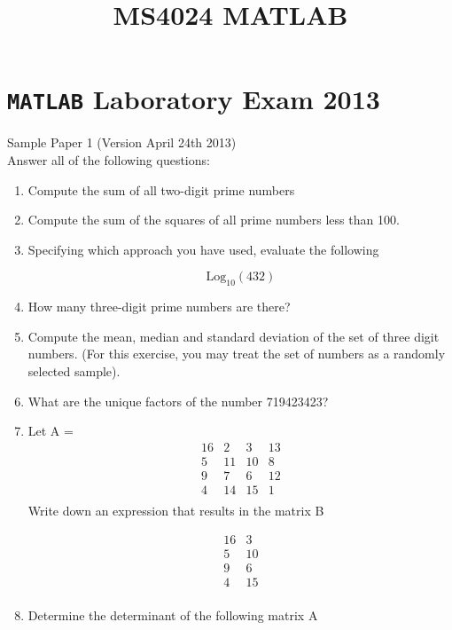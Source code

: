 \documentclass[12pt]{article}
\title{MS4024 MATLAB}
\begin{document}
\maketitle


\section*{\texttt{MATLAB} Laboratory Exam 2013}
Sample Paper 1 (Version April 24th 2013)\\
Answer all of the following questions:
\begin{enumerate}

\item Compute the sum of all two-digit prime numbers

\item Compute the sum of the squares of all prime numbers less than 100.

\item Specifying which approach you have used, evaluate the following

 \[ \mbox{Log}_{10}(432) \]

\item How many three-digit prime numbers are there?

\item Compute the mean, median and standard deviation of the set of three digit numbers.
(For this exercise, you may treat the set of numbers as a randomly selected sample).

\item What are the unique factors of the number 719423423?
\newpage
\item Let A =
\[
\begin{array}{cccc}
16 & 2 &  3 &13 \\
 5 & 11 & 10& 8 \\
9 & 7 &  6 &12 \\
 4 & 14 & 15& 1 \\
\end{array}
\]
Write down an expression that results in the matrix B

\[
\begin{array}{cc}
16 &  3  \\
 5 &  10 \\
 9 &  6  \\
 4 &  15 \\
\end{array}
\]

\item Determine the determinant of the following matrix A


\end{enumerate}
\end{document}
